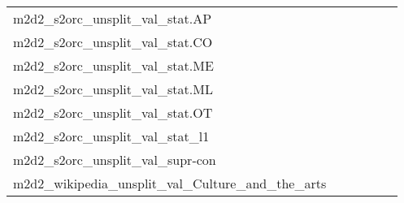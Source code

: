 {\begin{longtable}{m{6cm}m{1.7cm}m{1.7cm}m{1.7cm}m{1.7cm}m{1.7cm}}
	m2d2\_s2orc\_unsplit\_val\_stat.AP  & \colorbox[HTML]{c5e799}{\makebox[\mywidth][c]{13.37}} & \colorbox[HTML]{e6f5ad}{\makebox[\mywidth][c]{13.56}} & \colorbox[HTML]{ffffe5}{\makebox[\mywidth][c]{15.52}} & \colorbox[HTML]{d1ec9f}{\makebox[\mywidth][c]{13.42}} & \colorbox[HTML]{77c578}{\makebox[\mywidth][c]{13.15}}\\
	m2d2\_s2orc\_unsplit\_val\_stat.CO  & \colorbox[HTML]{fcfdd5}{\makebox[\mywidth][c]{13.07}} & \colorbox[HTML]{def2a6}{\makebox[\mywidth][c]{12.56}} & \colorbox[HTML]{ffffe5}{\makebox[\mywidth][c]{14.42}} & \colorbox[HTML]{c9e99b}{\makebox[\mywidth][c]{12.46}} & \colorbox[HTML]{77c578}{\makebox[\mywidth][c]{12.24}}\\
	m2d2\_s2orc\_unsplit\_val\_stat.ME  & \colorbox[HTML]{ceeb9e}{\makebox[\mywidth][c]{11.09}} & \colorbox[HTML]{ebf7b0}{\makebox[\mywidth][c]{11.26}} & \colorbox[HTML]{ffffe5}{\makebox[\mywidth][c]{12.91}} & \colorbox[HTML]{d3eda0}{\makebox[\mywidth][c]{11.11}} & \colorbox[HTML]{77c578}{\makebox[\mywidth][c]{10.87}}\\
	m2d2\_s2orc\_unsplit\_val\_stat.ML  & \colorbox[HTML]{95d284}{\makebox[\mywidth][c]{11.13}} & \colorbox[HTML]{def2a6}{\makebox[\mywidth][c]{11.39}} & \colorbox[HTML]{ffffe5}{\makebox[\mywidth][c]{13.29}} & \colorbox[HTML]{bae294}{\makebox[\mywidth][c]{11.23}} & \colorbox[HTML]{77c578}{\makebox[\mywidth][c]{11.06}}\\
	m2d2\_s2orc\_unsplit\_val\_stat.OT  & \colorbox[HTML]{9bd587}{\makebox[\mywidth][c]{11.31}} & \colorbox[HTML]{e1f3a9}{\makebox[\mywidth][c]{11.55}} & \colorbox[HTML]{ffffe5}{\makebox[\mywidth][c]{13.28}} & \colorbox[HTML]{cae99c}{\makebox[\mywidth][c]{11.45}} & \colorbox[HTML]{77c578}{\makebox[\mywidth][c]{11.24}}\\
	m2d2\_s2orc\_unsplit\_val\_stat\_l1  & \colorbox[HTML]{fcfdd5}{\makebox[\mywidth][c]{13.07}} & \colorbox[HTML]{def2a6}{\makebox[\mywidth][c]{12.56}} & \colorbox[HTML]{ffffe5}{\makebox[\mywidth][c]{14.42}} & \colorbox[HTML]{c9e99b}{\makebox[\mywidth][c]{12.46}} & \colorbox[HTML]{77c578}{\makebox[\mywidth][c]{12.24}}\\
	m2d2\_s2orc\_unsplit\_val\_supr-con  & \colorbox[HTML]{dff2a7}{\makebox[\mywidth][c]{11.57}} & \colorbox[HTML]{edf8b2}{\makebox[\mywidth][c]{11.66}} & \colorbox[HTML]{ffffe5}{\makebox[\mywidth][c]{13.13}} & \colorbox[HTML]{d8efa2}{\makebox[\mywidth][c]{11.53}} & \colorbox[HTML]{77c578}{\makebox[\mywidth][c]{11.30}}\\
	m2d2\_wikipedia\_unsplit\_val\_Culture\_and\_the\_arts  & \colorbox[HTML]{fefee2}{\makebox[\mywidth][c]{12.30}} & \colorbox[HTML]{eef8b2}{\makebox[\mywidth][c]{11.90}} & \colorbox[HTML]{ffffe5}{\makebox[\mywidth][c]{12.82}} & \colorbox[HTML]{cae99c}{\makebox[\mywidth][c]{11.78}} & \colorbox[HTML]{77c578}{\makebox[\mywidth][c]{11.66}}\\

\end{longtable}}
